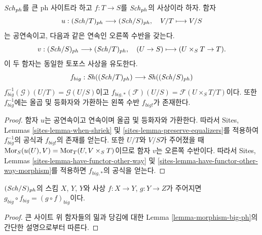 \begin{lemma}
\label{lemma-morphism-big-ph}
$\mathit{Sch}_{ph}$를 큰 ph 사이트라 하고
$f : T \to S$를 $\mathit{Sch}_{ph}$의 사상이라 하자. 함자
$$
u : (\mathit{Sch}/T)_{ph} \longrightarrow (\mathit{Sch}/S)_{ph},
\quad
V/T \longmapsto V/S
$$
는 공연속이고, 다음과 같은 연속인 오른쪽 수반을 갖는다.
$$
v : (\mathit{Sch}/S)_{ph} \longrightarrow (\mathit{Sch}/T)_{ph},
\quad
(U \to S) \longmapsto (U \times_S T \to T).
$$
이 두 함자는 동일한 토포스 사상을 유도한다.
$$
f_{big} :
\mathop{\mathit{Sh}}\nolimits((\mathit{Sch}/T)_{ph})
\longrightarrow
\mathop{\mathit{Sh}}\nolimits((\mathit{Sch}/S)_{ph})
$$
$f_{big}^{-1}(\mathcal{G})(U/T) = \mathcal{G}(U/S)$이고
$f_{big, *}(\mathcal{F})(U/S) = \mathcal{F}(U \times_S T/T)$이다.
또한 $f_{big}^{-1}$에는 올곱 및 등화자와 가환하는 왼쪽 수반
$f_{big!}$가 존재한다.
\end{lemma}

\begin{proof}
함자 $u$는 공연속이고 연속이며 올곱 및 등화자와 가환한다. 따라서
Sites, Lemmas \ref{sites-lemma-when-shriek} 및
\ref{sites-lemma-preserve-equalizers}를 적용하여 $f_{big}^{-1}$의 공식과
$f_{big!}$의 존재를 얻는다. 또한 $U/T$와 $V/S$가 주어졌을 때
$\mathop{\mathrm{Mor}}\nolimits_S(u(U), V) = \mathop{\mathrm{Mor}}\nolimits_T(U, V \times_S T)$이므로 함자 $v$는 오른쪽
수반이다. 따라서 Sites, Lemmas
\ref{sites-lemma-have-functor-other-way} 및
\ref{sites-lemma-have-functor-other-way-morphism}를 적용하면
$f_{big, *}$의 공식을 얻는다.
\end{proof}

\begin{lemma}
\label{lemma-composition-ph}
$(\mathit{Sch}/S)_{ph}$의 스킴 $X$, $Y$, $Y$와 사상
$f : X \to Y$, $g : Y \to Z$가 주어지면
$g_{big} \circ f_{big} = (g \circ f)_{big}$이다.
\end{lemma}

\begin{proof}
큰 사이트 위 함자들의 밂과 당김에 대한 Lemma
\ref{lemma-morphism-big-ph}의 간단한 설명으로부터 따른다.
\end{proof}



































